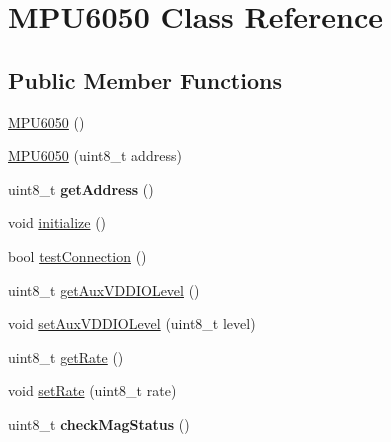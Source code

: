 \hypertarget{class_m_p_u6050}{\section{M\+P\+U6050 Class Reference}
\label{class_m_p_u6050}
}
\subsection*{Public Member Functions}
\begin{DoxyCompactItemize}
\item 
\hyperlink{class_m_p_u6050_a7c0146d45537e4bd7a0d4c1c476fdab7}{M\+P\+U6050} ()
\item 
\hyperlink{class_m_p_u6050_a94df4ec1565317ba5279122b3bf7e056}{M\+P\+U6050} (uint8\+\_\+t address)
\item 
\hypertarget{class_m_p_u6050_a7e510c87c65675020207aa3aff432a8a}{uint8\+\_\+t {\bfseries get\+Address} ()}\label{class_m_p_u6050_a7e510c87c65675020207aa3aff432a8a}

\item 
void \hyperlink{class_m_p_u6050_abd8fc6c18adf158011118fbccc7e7054}{initialize} ()
\item 
bool \hyperlink{class_m_p_u6050_a95ffab7b44fce3834236e0813687d11a}{test\+Connection} ()
\item 
uint8\+\_\+t \hyperlink{class_m_p_u6050_af6e9af8e2222889fd5458e2ae12c55c8}{get\+Aux\+V\+D\+D\+I\+O\+Level} ()
\item 
void \hyperlink{class_m_p_u6050_a7c666c20e26869bc80646f1b2c3d69bc}{set\+Aux\+V\+D\+D\+I\+O\+Level} (uint8\+\_\+t level)
\item 
uint8\+\_\+t \hyperlink{class_m_p_u6050_a887a173e079980505763ffd1aa9fec05}{get\+Rate} ()
\item 
void \hyperlink{class_m_p_u6050_a7d03801d6b656e8e12cd3c1dd97824a8}{set\+Rate} (uint8\+\_\+t rate)
\item 
\hypertarget{class_m_p_u6050_aeebb7b7670c9b3f4f172bcc65c554c94}{uint8\+\_\+t {\bfseries check\+Mag\+Status} ()}\label{class_m_p_u6050_aeebb7b7670c9b3f4f172bcc65c554c94}


\end{DoxyCompactItemize}
